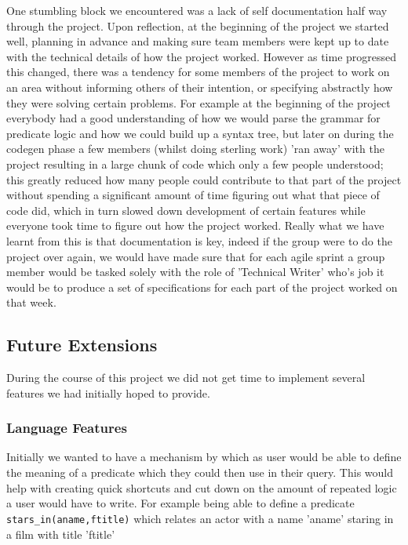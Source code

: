 \documentclass[a4paper, 11pt]{article}
\begin{document}
  
  One stumbling block we encountered was a lack of self documentation half way
  through the project. Upon reflection, at the beginning of the project we 
  started well, planning in advance and making sure team members were kept up 
  to date with the technical details of how the project worked. However as time 
  progressed this changed, there was a tendency for some members of the project 
  to work on an area without informing others of their intention, or specifying 
  abstractly how they were solving certain problems. For example at the beginning 
  of the project everybody had a good understanding of how we would parse the 
  grammar for predicate logic and how we could build up a syntax tree, but later 
  on during the codegen phase a few members (whilst doing sterling work) 'ran away'
  with the project resulting in a large chunk of code which only a few people
  understood; this greatly reduced how many people could contribute to that part
  of the project without spending a significant amount of time figuring out what
  that piece of code did, which in turn slowed down development of certain
  features while everyone took time to figure out how the project worked.
  Really what we have learnt from this is that documentation is key, indeed if the
  group were to do the project over again, we would have made sure that for each
  agile sprint a group member would be tasked solely with the role of 'Technical
  Writer' who's job it would be to produce a set of specifications for each part
  of the project worked on that week. 


  \subsection{Future Extensions}
    During the course of this project we did not get time to implement several
    features we had initially hoped to provide. 

    \subsubsection{Language Features}
    Initially we wanted to have a mechanism by which as user would be able to
    define the meaning of a predicate which they could then use in their query.
    This would help with creating quick shortcuts and cut down on the amount of 
    repeated logic a user would have to write. For example being able to define a 
    predicate \texttt{stars\_in(aname,ftitle)} which relates an actor with a name 
    'aname' staring in a film with title 'ftitle'
\end{document}
